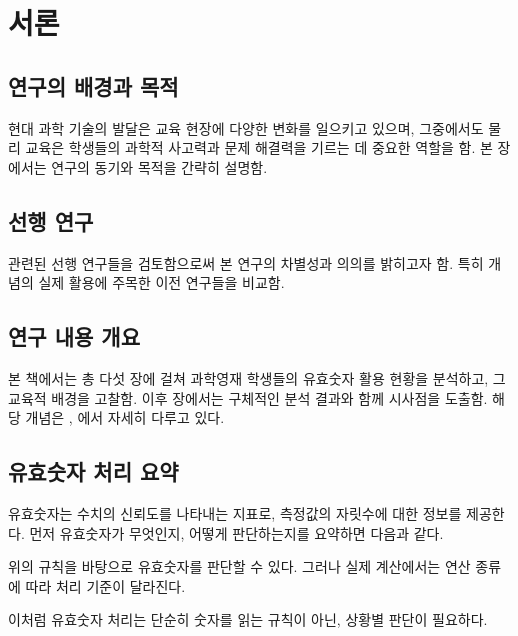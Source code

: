 \chapter{서론}

\section{연구의 배경과 목적}
현대 과학 기술의 발달은 교육 현장에 다양한 변화를 일으키고 있으며, 그중에서도 물리 교육은 학생들의 과학적 사고력과 문제 해결력을 기르는 데 중요한 역할을 함. 본 장에서는 연구의 동기와 목적을 간략히 설명함.

\section{선행 연구}
관련된 선행 연구들을 검토함으로써 본 연구의 차별성과 의의를 밝히고자 함. 특히  개념의 실제 활용에 주목한 이전 연구들을 비교함.

\section{연구 내용 개요}
본 책에서는 총 다섯 장에 걸쳐 과학영재 학생들의 유효숫자 활용 현황을 분석하고, 그 교육적 배경을 고찰함. 이후 장에서는 구체적인 분석 결과와 함께 시사점을 도출함.
해당 개념은 \cite{halliday2022}, \cite{kim2021sigfig}에서 자세히 다루고 있다.


\section{유효숫자 처리 요약}

유효숫자는 수치의 신뢰도를 나타내는 지표로, 측정값의 자릿수에 대한 정보를 제공한다. 먼저 유효숫자가 무엇인지, 어떻게 판단하는지를 요약하면 다음과 같다.
\newpage


\summarytableA

위의 규칙을 바탕으로 유효숫자를 판단할 수 있다. 그러나 실제 계산에서는 연산 종류에 따라 처리 기준이 달라진다.

\summarytableB

이처럼 유효숫자 처리는 단순히 숫자를 읽는 규칙이 아닌, 상황별 판단이 필요하다.
